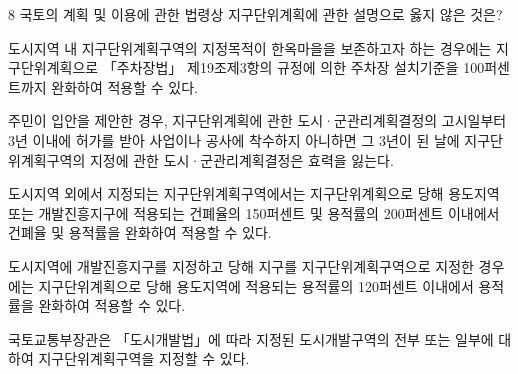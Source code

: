 \begin{question}{8}
국토의 계획 및 이용에 관한 법령상 지구단위계획에 관한 설명으로 옳지 않은 것은?
\begin{choices}
  \item 도시지역 내 지구단위계획구역의 지정목적이 한옥마을을 보존하고자 하는 경우에는 지구단위계획으로 「주차장법」 제19조제3항의 규정에 의한 주차장 설치기준을 100퍼센트까지 완화하여 적용할 수 있다.
  \item 주민이 입안을 제안한 경우, 지구단위계획에 관한 도시·군관리계획결정의 고시일부터 3년 이내에 허가를 받아 사업이나 공사에 착수하지 아니하면 그 3년이 된 날에 지구단위계획구역의 지정에 관한 도시·군관리계획결정은 효력을 잃는다.
  \item 도시지역 외에서 지정되는 지구단위계획구역에서는 지구단위계획으로 당해 용도지역 또는 개발진흥지구에 적용되는 건폐율의 150퍼센트 및 용적률의 200퍼센트 이내에서 건폐율 및 용적률을 완화하여 적용할 수 있다.
  \item 도시지역에 개발진흥지구를 지정하고 당해 지구를 지구단위계획구역으로 지정한 경우에는 지구단위계획으로 당해 용도지역에 적용되는 용적률의 120퍼센트 이내에서 용적률을 완화하여 적용할 수 있다.
  \item 국토교통부장관은 「도시개발법」에 따라 지정된 도시개발구역의 전부 또는 일부에 대하여 지구단위계획구역을 지정할 수 있다.
\end{choices}
\end{question}
